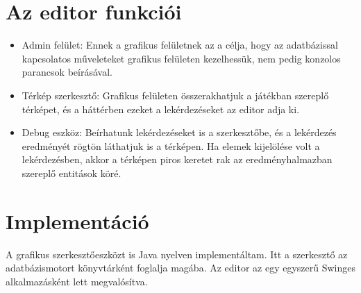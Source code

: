 
\section{Az editor funkciói}

\begin{itemize}
\item Admin felület: Ennek a grafikus felületnek az a célja, hogy az
adatbázissal kapcsolatos műveleteket grafikus felületen kezelhessük, nem pedig konzolos parancsok beírásával.
\item Térkép szerkesztő: Grafikus felületen összerakhatjuk a játékban szereplő térképet, és a háttérben ezeket a lekérdezéseket az editor adja ki.
\item Debug eszköz: Beírhatunk lekérdezéseket is a szerkesztőbe, és a lekérdezés eredményét rögtön láthatjuk is a térképen. Ha elemek kijelölése volt a lekérdezésben, akkor a térképen piros keretet rak az eredményhalmazban szereplő entitások köré.
	
\end{itemize}

\section{Implementáció}

A grafikus szerkesztőeszközt is Java nyelven implementáltam. Itt a szerkesztő az adatbázismotort könyvtárként foglalja magába. Az editor az egy egyszerű Swinges alkalmazásként lett megvalósítva. 